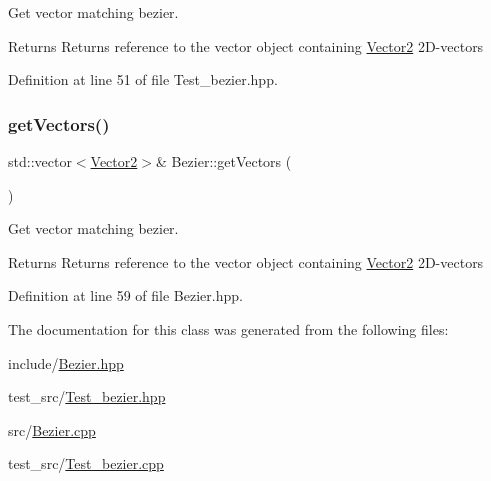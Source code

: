 Get vector matching bezier. 

\begin{DoxyReturn}{Returns}
Returns reference to the vector object containing \mbox{\hyperlink{classVector2}{Vector2}} 2\+D-\/vectors 
\end{DoxyReturn}


Definition at line 51 of file Test\+\_\+bezier.\+hpp.

\mbox{\label{classBezier_a26bf332b0c831e0f302f1d72ec782436}} 
\subsubsection{\texorpdfstring{get\+Vectors()}{getVectors()}\hspace{0.1cm}{\footnotesize\ttfamily [2/2]}}
{\footnotesize\ttfamily std\+::vector$<$\mbox{\hyperlink{classVector2}{Vector2}}$>$\& Bezier\+::get\+Vectors (\begin{DoxyParamCaption}{ }\end{DoxyParamCaption})\hspace{0.3cm}{\ttfamily [inline]}}



Get vector matching bezier. 

\begin{DoxyReturn}{Returns}
Returns reference to the vector object containing \mbox{\hyperlink{classVector2}{Vector2}} 2\+D-\/vectors 
\end{DoxyReturn}


Definition at line 59 of file Bezier.\+hpp.



The documentation for this class was generated from the following files\+:\begin{DoxyCompactItemize}
\item 
include/\mbox{\hyperlink{Bezier_8hpp}{Bezier.\+hpp}}\item 
test\+\_\+src/\mbox{\hyperlink{Test__bezier_8hpp}{Test\+\_\+bezier.\+hpp}}\item 
src/\mbox{\hyperlink{Bezier_8cpp}{Bezier.\+cpp}}\item 
test\+\_\+src/\mbox{\hyperlink{Test__bezier_8cpp}{Test\+\_\+bezier.\+cpp}}\end{DoxyCompactItemize}
